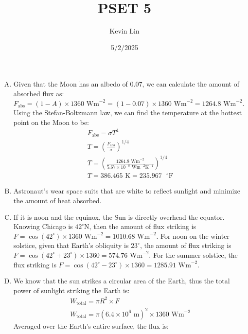 \documentclass[11pt,a4paper,margin=1in]{article}
\title{PSET 5}
\author{Kevin Lin}
\date{5/2/2025}
\begin{document}
\maketitle
\section{}
\begin{enumerate}[A.]
    \item 
    Given that the Moon has an albedo of 0.07, we can calculate the amount
    of absorbed flux as: $F_\text{abs} = (1 - A) \times 1360 \text{ Wm}^{-2} = (1
    - 0.07) \times 1360 \text{ Wm}^{-2} = 1264.8 \text{ Wm}^{-2}$. Using the 
    Stefan-Boltzmann law, we can find the temperature at the hottest point on the
    Moon to be:
    \begin{gather*}
        F_\text{abs} = \sigma T^4 \\
        T = \left( \frac{F_\text{abs}}{\sigma} \right)^{1/4} \\
        T = \left( \frac{1264.8 \text{ Wm}^{-2}}{5.67 \times 10^{-8} \text{ Wm}^{-2} 
            \text{K}^{-4}} \right)^{1/4} \\
        T = 386.465 \text{ K} = 235.967 \text{ }^{\circ}\text{F}
    \end{gather*}
    \item 
    Astronaut's wear space suits that are white to reflect sunlight and 
    minimize the amount of heat absorbed.
    \item 
    If it is noon and the equinox, the Sun is directly overhead the equator.
    Knowing Chicago is $42^{\circ}$N, then the amount of flux striking is 
    $F = \cos(42^{\circ}) \times 1360 \text{ Wm}^{-2} = 1010.68 \text{ Wm}^{-2}$. 
    For noon on the winter solstice, given that Earth's obliquity is $23^{\circ}$,
    the amount of flux striking is $F = \cos(42^{\circ} + 23^{\circ}) \times 1360
    = 574.76 \text{ Wm}^{-2}$. For the summer solstice, the flux striking is $F 
    = \cos(42^{\circ} - 23^{\circ}) \times 1360 = 1285.91 \text{ Wm}^{-2}$. 
    \item 
    We know that the sun strikes a circular area of the Earth, thus the total power
    of sunlight striking the Earth is:
    \begin{gather*}
        W_\text{total} = \pi R^2 \times F \\
        W_\text{total} = \pi (6.4 \times 10^6 \text { m})^2 \times 1360 \text{ Wm}^{-2}
    \end{gather*}
    Averaged over the Earth's entire surface, the flux is:

\end{enumerate}
\end{document}
